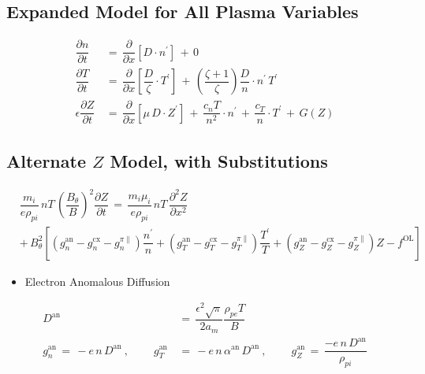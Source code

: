 \documentclass[a4paper,10pt]{article}
\providecommand{\tightlist}{%
  \setlength{\itemsep}{0pt}\setlength{\parskip}{0pt}}
\begin{document}
\hypertarget{expanded-model-for-all-plasma-variables}{%
\subsection{Expanded Model for All Plasma
Variables}\label{expanded-model-for-all-plasma-variables}}

\begin{align}
    \dfrac{\partial n}{\partial t} \,&=\, \dfrac{\partial}{\partial x}\left[D \cdot n^\prime\right] \,+\, 0 \\
    \dfrac{\partial T}{\partial t} \,&=\, \dfrac{\partial}{\partial x}\left[\dfrac{D}{\zeta} \cdot T^\prime\right] \,+\, \left(\dfrac{\zeta + 1}{\zeta}\right) \dfrac{D}{n} \cdot n^\prime \, T^\prime \\
    \epsilon \dfrac{\partial Z}{\partial t} \,&=\, \dfrac{\partial}{\partial x}\left[\mu\,D \cdot Z^\prime\right] \,+\, \dfrac{c_n T}{n^2} \cdot n^\prime \,+\, \dfrac{c_T}{n} \cdot T^\prime \,+\, G(Z)
\end{align}

\hypertarget{alternate-z-model-with-substitutions}{%
\subsection{\texorpdfstring{Alternate \(Z\) Model, with
Substitutions}{Alternate Z Model, with Substitutions}}\label{alternate-z-model-with-substitutions}}

\begin{align}
    &\dfrac{m_i}{e \rho_{pi}} \,n T\, \left(\dfrac{B_\theta}{B}\right)^2 \dfrac{\partial Z}{\partial t} \,=\, \dfrac{m_i \mu_i}{e \rho_{pi}} \,n T\, \dfrac{\partial^2 Z}{\partial x^2} \\
    &+\, B_\theta^2 \left[\left(g_n^\text{an} - g_n^\text{cx} - g_n^{\pi\parallel}\right) \dfrac{n^\prime}{n} + \left(g_T^\text{an} - g_T^\text{cx} - g_T^{\pi\parallel}\right) \dfrac{T^\prime}{T} + \left(g_Z^\text{an} - g_Z^\text{cx} - g_Z^{\pi\parallel}\right) Z - f^\text{OL}\right]
\end{align}

\begin{itemize}
\tightlist
\item
  Electron Anomalous Diffusion
\end{itemize}

\begin{align}
    D^\text{an} \,&=\, \dfrac{\epsilon^2 \sqrt{\pi}}{2 a_m} \dfrac{\rho_{pe} T}{B} \\
    g_n^\text{an} \,=\, -e \,n\, D^\text{an}~,~~~~~~~~~~ g_T^\text{an} \,&=\, -e \,n\, \alpha^\text{an}\, D^\text{an}~,~~~~~~~~~~ g_Z^\text{an} \,=\, \dfrac{-e \,n\, D^\text{an}}{\rho_{pi}}
\end{align}
\end{document}
